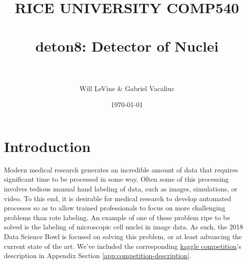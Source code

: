 \documentclass[paper=letter, fontsize=12pt]{article}
\title{	
\normalfont \normalsize 
\textsc{RICE UNIVERSITY COMP540} \\ [25pt]
\horrule{0.5pt} \\[0.4cm] %
\huge deton8: Detector of Nuclei \\ %
\horrule{2pt} \\[0.5cm] %
}
\author{Will LeVine \& Gabriel Vacaliuc}
\date{\normalsize\today}
\numberwithin{equation}{section} %
\numberwithin{figure}{section} %
\numberwithin{table}{section} %
\begin{document}
\maketitle

\begin{abstract}
    \blindtext
\end{abstract}

\newpage

\tableofcontents

\newpage



\section{Introduction}

Modern medical research generates an incredible amount of data that requires
significant time to be processed in some way.  Often some of this processing
involves tedious manual hand labeling of data, such as images, simulations, or
video.  To this end, it is desirable for medical research to develop automated
processes so as to allow trained professionals to focus on more challenging
problems than rote labeling.  An example of one of these problem ripe to be
solved is the labeling of microscopic cell nuclei in image data.  As such, the
2018 Data Science Bowl is focused on solving this problem, or at least
advancing the current state of the art.  We've included the corresponding
\href{https://www.kaggle.com/c/data-science-bowl-2018}{kaggle competition}'s
description in Appendix Section \ref{app:competition-description}.
\end{document}
